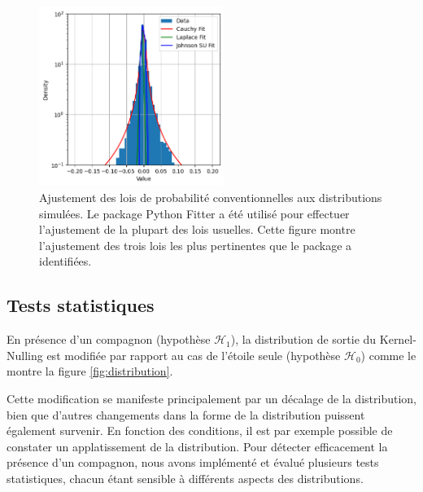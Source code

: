 \documentclass{article}
\begin{document}
\begin{figure}[H]
\centering
\includegraphics[width=6cm]{img/fits.png}
\caption{Ajustement des lois de probabilité conventionnelles aux distributions simulées. Le package Python Fitter a été utilisé pour effectuer l'ajustement de la plupart des lois usuelles. Cette figure montre l'ajustement des trois lois les plus pertinentes que le package a identifiées.}
\label{fig:fits}
\end{figure}



\subsection{Tests statistiques}

En présence d'un compagnon (hypothèse $\mathcal{H}_1$), la distribution de sortie du Kernel-Nulling est modifiée par rapport au cas de l'étoile seule (hypothèse $\mathcal{H}_0$) comme le montre la figure \ref{fig:distribution}.

Cette modification se manifeste principalement par un décalage de la distribution, bien que d'autres changements dans la forme de la distribution puissent également survenir. En fonction des conditions, il est par exemple possible de constater un applatissement de la distribution. Pour détecter efficacement la présence d'un compagnon, nous avons implémenté et évalué plusieurs tests statistiques, chacun étant sensible à différents aspects des distributions.

\end{document}
